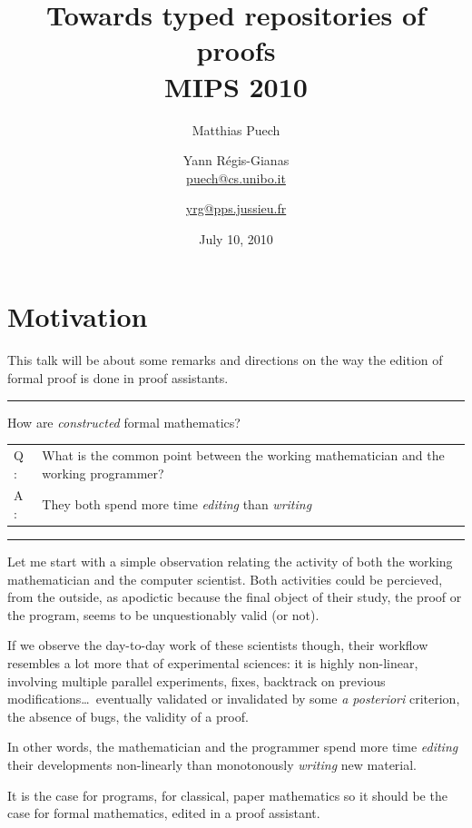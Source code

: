\documentclass[ignorenonframetext,red]{beamer}
\title{Towards typed repositories of proofs \\[0.6em] 
  \small \textsf{MIPS 2010}}
\date{July 10, 2010}
\author[Matthias Puech \& Yann Régis-Gianas] {
Matthias Puech\inst{1} \and Yann Régis-Gianas\inst{2} \\
{\small \url{puech@cs.unibo.it}} \and {\small \url{yrg@pps.jussieu.fr}}
}
\institute {
  \inst 1 {\small Dept. of Computer Science, University of Bologna} \and
  \inst 2 {\small University Paris 7, CNRS, and INRIA, PPS, team ${\pi}r^2$}
}
\begin{document}
\begin{frame}
  \titlepage
\end{frame}

\section{Motivation}

This talk will be about some remarks and directions on the way the
edition of formal proof is done in proof assistants.

\hrule
\begin{frame}{How are \emph{constructed} formal mathematics?}
  \large
  \begin{tabular}{ll}
    {\Huge Q :} & \parbox{0.8\textwidth}{What is the common point between the working
      mathematician and the working programmer?} \\[2em]
    \pause
    {\Huge A :} & They both spend more time \emph{editing} than \emph{writing}
  \end{tabular}
\end{frame}
\hrule

Let me start with a simple observation relating the activity of both
the working mathematician and the computer scientist. Both activities
could be percieved, from the outside, as apodictic because the final
object of their study, the proof or the program, seems to be
unquestionably valid (or not).

If we observe the day-to-day work of these scientists though, their
workflow resembles a lot more that of experimental sciences: it is
highly non-linear, involving multiple parallel experiments, fixes,
backtrack on previous modifications\ldots\ eventually validated or
invalidated by some \emph{a posteriori} criterion, the absence of
bugs, the validity of a proof.

In other words, the mathematician and the programmer spend more time
\emph{editing} their developments non-linearly than monotonously
\emph{writing} new material.

It is the case for programs, for classical, paper mathematics so it
should be the case for formal mathematics, edited in a proof
assistant.
\end{document}
